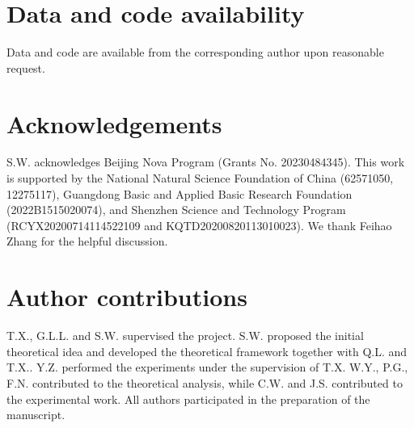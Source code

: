 \documentclass[aps,pra,twocolumn,superscriptaddress,preprintnumbers,amsmath,amssymb]{revtex4-2}
\begin{document}
\section*{Data and code availability} 
Data and code are available from the corresponding author upon reasonable request.
\section*{Acknowledgements} 

S.W. acknowledges  Beijing Nova Program (Grants No. 20230484345). This work is supported by the National Natural Science Foundation of China (62571050, 12275117), Guangdong Basic and Applied Basic Research Foundation (2022B1515020074), and Shenzhen Science and Technology Program (RCYX20200714114522109 and KQTD20200820113010023). We thank Feihao Zhang for the helpful discussion. 

\section*{Author contributions}
T.X.,  G.L.L. and S.W. supervised the project. S.W. proposed the initial theoretical idea and developed the theoretical framework together with Q.L. and T.X.. Y.Z. performed the experiments under the supervision of T.X. W.Y., P.G., F.N. contributed to the theoretical analysis, while C.W. and J.S. contributed to the experimental work. All authors participated in the preparation of the manuscript.
\end{document}

